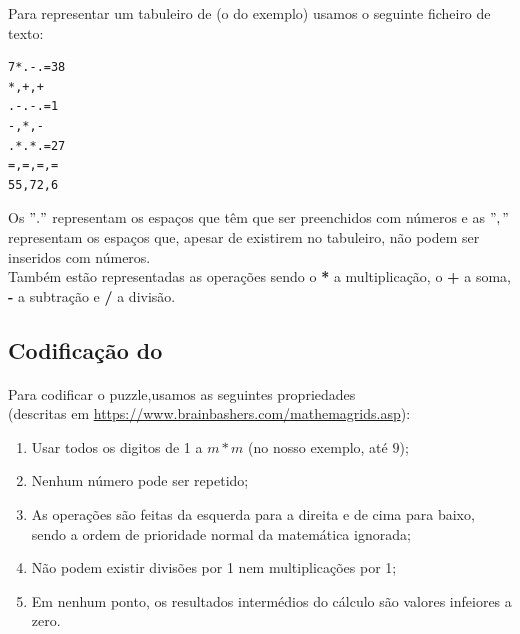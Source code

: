 \documentclass{article}
\begin{document}
Para representar um tabuleiro de {} (o do exemplo) usamos o seguinte ficheiro de texto:
\begin{center}
\begin{verbatim}
7*.-.=38
*,+,+
.-.-.=1
-,*,-
.*.*.=27
=,=,=,=
55,72,6
\end{verbatim}
\end{center}

Os $"."$ representam os espaços que têm que ser preenchidos com números e as $","$ representam os espaços que, apesar de existirem no tabuleiro, não podem ser inseridos com números. 
\\

Também estão representadas as operações sendo o {\bf{*}} a multiplicação, o  {\bf{+}} a soma, {\bf{-}} a subtração e {\bf{/}} a divisão. 




\subsection{Codificação do {}}
\paragraph{} Para codificar o puzzle,usamos as seguintes propriedades \\
(descritas em {\url{https://www.brainbashers.com/mathemagrids.asp}}):
 \begin{enumerate}
 \item Usar todos os digitos de 1 a $m*m$ (no nosso exemplo, até $9$);
 \item Nenhum número pode ser repetido;
 \item As operações são feitas da esquerda para a direita e de cima para baixo, sendo a ordem de prioridade normal da matemática ignorada;
 \item Não podem existir divisões por 1 nem multiplicações por 1;
\item Em nenhum ponto, os resultados intermédios do cálculo são valores infeiores a zero.
 \end{enumerate}
\end{document}

